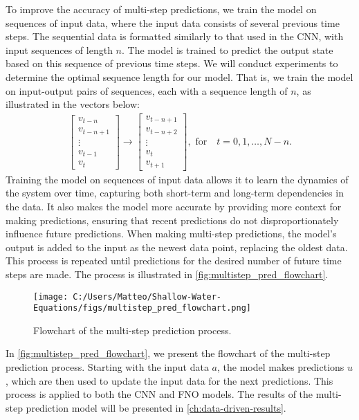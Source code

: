 To improve the accuracy of multi-step predictions, we train the model on sequences of input data, where the input data consists of several previous time steps.
The sequential data is formatted similarly to that used in the CNN, with input sequences of length $n$.
The model is trained to predict the output state based on this sequence of previous time steps.
We will conduct experiments to determine the optimal sequence length for our model.
That is, we train the model on input-output pairs of sequences, each with a sequence length of $n$, as illustrated in the vectors below:
\begin{align*}
    \begin{bmatrix}
        v_{t-n} \\ v_{t-n+1} \\ \vdots \\ v_{t-1} \\ v_t
    \end{bmatrix}
    \to
    \begin{bmatrix}
        v_{t-n+1} \\ v_{t-n+2} \\ \vdots \\ v_{t} \\ v_{t+1}
    \end{bmatrix},
    \text{ for} \quad t = 0, 1, \ldots, N-n.
\end{align*}
Training the model on sequences of input data allows it to learn the dynamics of the system over time, capturing both short-term and long-term dependencies in the data.
It also makes the model more accurate by providing more context for making predictions, ensuring that recent predictions do not disproportionately influence future predictions.
When making multi-step predictions, the model's output is added to the input as the newest data point, replacing the oldest data.
This process is repeated until predictions for the desired number of future time steps are made.
The process is illustrated in \autoref{fig:multistep_pred_flowchart}.
\begin{figure}[H]
    \centering
    \texttt{[image: C:/Users/Matteo/Shallow-Water-Equations/figs/multistep\_pred\_flowchart.png]}
    \caption{Flowchart of the multi-step prediction process.}\label{fig:multistep_pred_flowchart}
\end{figure}
In \autoref{fig:multistep_pred_flowchart}, we present the flowchart of the multi-step prediction process.
Starting with the input data $a$, the model makes predictions $u$, which are then used to update the input data for the next predictions.
This process is applied to both the CNN and FNO models.
The results of the multi-step prediction model will be presented in \autoref{ch:data-driven-results}.
